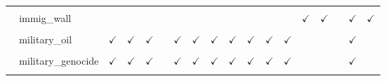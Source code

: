 \documentclass[
  12pt]{article}
\begin{document}
\begin{table}[H]
{\begin{tabular}{lcccccccccccccccc}
\cellcolor{gray!6}{$\hspace{10pt}$immig\_reduce} & \cellcolor{gray!6}{} & \cellcolor{gray!6}{} & \cellcolor{gray!6}{} & \cellcolor{gray!6}{} & \cellcolor{gray!6}{} & \cellcolor{gray!6}{} & \cellcolor{gray!6}{} & \cellcolor{gray!6}{} & \cellcolor{gray!6}{} & \cellcolor{gray!6}{} & \cellcolor{gray!6}{} & \cellcolor{gray!6}{} & \cellcolor{gray!6}{$\checkmark$} & \cellcolor{gray!6}{$\checkmark$} & \cellcolor{gray!6}{$\checkmark$} & \cellcolor{gray!6}{}\\
$\hspace{10pt}$immig\_wall &  &  &  &  &  &  &  &  &  &  &  & $\checkmark$ & $\checkmark$ &  & $\checkmark$ & $\checkmark$\\
\cellcolor{gray!6}{$\textbf{Military}$} & \cellcolor{gray!6}{} & \cellcolor{gray!6}{} & \cellcolor{gray!6}{} & \cellcolor{gray!6}{} & \cellcolor{gray!6}{} & \cellcolor{gray!6}{} & \cellcolor{gray!6}{} & \cellcolor{gray!6}{} & \cellcolor{gray!6}{} & \cellcolor{gray!6}{} & \cellcolor{gray!6}{} & \cellcolor{gray!6}{} & \cellcolor{gray!6}{} & \cellcolor{gray!6}{} & \cellcolor{gray!6}{} & \cellcolor{gray!6}{}\\
$\hspace{10pt}$military\_oil & $\checkmark$ & $\checkmark$ & $\checkmark$ &  & $\checkmark$ & $\checkmark$ & $\checkmark$ & $\checkmark$ & $\checkmark$ & $\checkmark$ & $\checkmark$ &  &  &  & $\checkmark$ & \\
\cellcolor{gray!6}{$\hspace{10pt}$military\_terroristcamp} & \cellcolor{gray!6}{$\checkmark$} & \cellcolor{gray!6}{$\checkmark$} & \cellcolor{gray!6}{$\checkmark$} & \cellcolor{gray!6}{} & \cellcolor{gray!6}{$\checkmark$} & \cellcolor{gray!6}{$\checkmark$} & \cellcolor{gray!6}{$\checkmark$} & \cellcolor{gray!6}{$\checkmark$} & \cellcolor{gray!6}{$\checkmark$} & \cellcolor{gray!6}{$\checkmark$} & \cellcolor{gray!6}{$\checkmark$} & \cellcolor{gray!6}{} & \cellcolor{gray!6}{} & \cellcolor{gray!6}{} & \cellcolor{gray!6}{$\checkmark$} & \cellcolor{gray!6}{}\\
$\hspace{10pt}$military\_genocide & $\checkmark$ & $\checkmark$ & $\checkmark$ &  & $\checkmark$ & $\checkmark$ & $\checkmark$ & $\checkmark$ & $\checkmark$ & $\checkmark$ & $\checkmark$ &  &  &  & $\checkmark$ & \\
\cellcolor{gray!6}{$\hspace{10pt}$military\_democracy} & \cellcolor{gray!6}{$\checkmark$} & \cellcolor{gray!6}{$\checkmark$} & \cellcolor{gray!6}{$\checkmark$} & \cellcolor{gray!6}{} & \cellcolor{gray!6}{$\checkmark$} & \cellcolor{gray!6}{$\checkmark$} & \cellcolor{gray!6}{$\checkmark$} & \cellcolor{gray!6}{$\checkmark$} & \cellcolor{gray!6}{$\checkmark$} & \cellcolor{gray!6}{$\checkmark$} & \cellcolor{gray!6}{$\checkmark$} & \cellcolor{gray!6}{} & \cellcolor{gray!6}{} & \cellcolor{gray!6}{} & \cellcolor{gray!6}{$\checkmark$} & \cellcolor{gray!6}{}\\

\end{tabular}}
\end{table}
\end{document}
